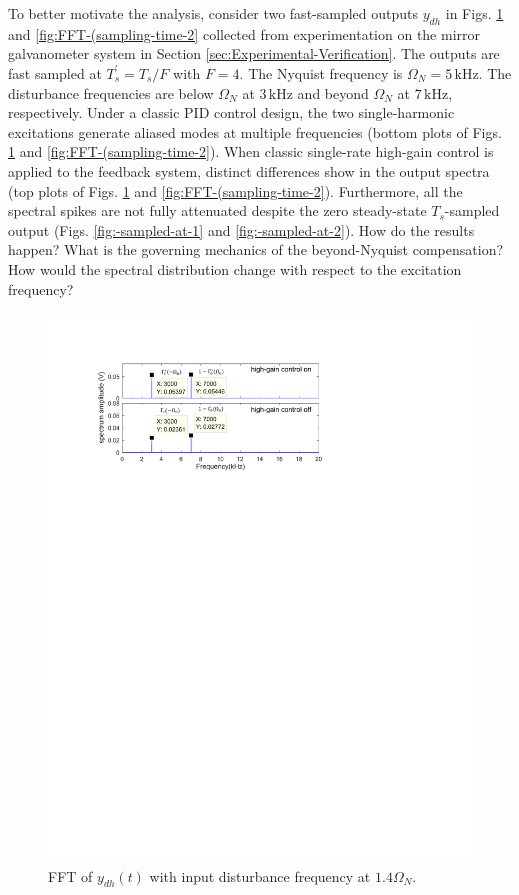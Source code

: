 \documentclass [11pt, proquest] {uwthesis}[2020/02/24]
\begin{document}
To better motivate the analysis, consider two fast-sampled outputs
$y_{dh}$ in Figs. \ref{fig:FFT-(sampling-time-1} and \ref{fig:FFT-(sampling-time-2}
collected from experimentation on the mirror galvanometer system in
Section \ref{sec:Experimental-Verification}. The outputs are fast
sampled at $T_{s}^{'}=T_{s}/F$ with $F=4$. The Nyquist frequency
is $\Omega_{N}=5\,\text{kHz}$. The disturbance frequencies are below
$\Omega_{N}$ at $3\,\text{kHz}$ and beyond $\Omega_{N}$ at $7\,\text{kHz}$,
respectively. Under a classic PID control design, the two single-harmonic
excitations generate aliased modes at multiple frequencies (bottom
plots of Figs. \ref{fig:FFT-(sampling-time-1} and \ref{fig:FFT-(sampling-time-2}).
When classic single-rate high-gain control \cite{XuChen_TCST2012}
is applied to the feedback system, distinct differences show in the
output spectra (top plots of Figs. \ref{fig:FFT-(sampling-time-1}
and \ref{fig:FFT-(sampling-time-2}). Furthermore, all the spectral
spikes are not fully attenuated despite the zero steady-state $T_{s}$-sampled
output (Figs. \ref{fig:-sampled-at-1} and \ref{fig:-sampled-at-2}).
How do the results happen? What is the governing mechanics of the
beyond-Nyquist compensation? How would the spectral distribution change
with respect to the excitation frequency?
\begin{figure}[!ht]
\begin{centering}
\includegraphics[width=13cm]{Spectral-analysis/FIG3.pdf}
\par\end{centering}
\caption{\label{fig:FFT-(sampling-time-1}FFT of $y_{dh}(t)$
with input disturbance frequency at $1.4\Omega_{N}$.}
\end{figure}
\end{document}
